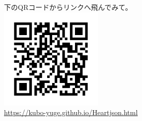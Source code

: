 \documentclass[uplatex,dvipdfmx,a4paper,twoside]{jsarticle}
\begin{document}
\begin{multicols}{2}
下のQRコードからリンクへ飛んでみて。\\

\includegraphics[bb=18 18 150 150,width=50mm,clip]{HeartQR.png}\\

\url{https://kubo-yuge.github.io/Heartjson.html}\\


\newpage

\end{multicols}
\end{document}
